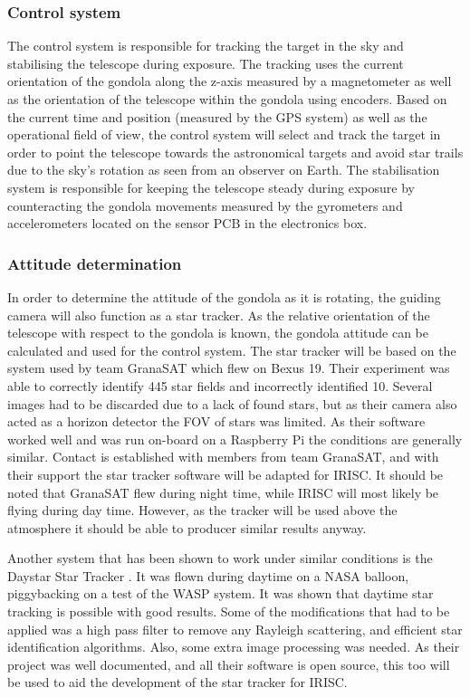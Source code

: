 
\subsubsection{Control system}
The control system is responsible for tracking the target in the sky and stabilising the telescope during exposure. The tracking uses the current orientation of the gondola along the z-axis measured by a magnetometer as well as the orientation of the telescope within the gondola using encoders. Based on the current time and position (measured by the GPS system) as well as the operational field of view, the control system will select and track the target in order to point the telescope towards the astronomical targets and avoid star trails due to the sky's rotation as seen from an observer on Earth. The stabilisation system is responsible for keeping the telescope steady during exposure by counteracting the gondola movements measured by the gyrometers and accelerometers located on the sensor PCB in the electronics box.


\subsubsection{Attitude determination}
In order to determine the attitude of the gondola as it is rotating, the guiding camera will also function as a star tracker. As the relative orientation of the telescope with respect to the gondola is known, the gondola attitude can be calculated and used for the control system. The star tracker will be based on the system used by team GranaSAT which flew on Bexus 19. Their experiment was able to correctly identify 445 star fields and incorrectly identified 10. Several images had to be discarded due to a lack of found stars, but as their camera also acted as a horizon detector the FOV of stars was limited. As their software worked well and was run on-board on a Raspberry Pi the conditions are generally similar. Contact is established with members from team GranaSAT, and with their support the star tracker software will be adapted for IRISC. It should be noted that GranaSAT flew during night time, while IRISC will most likely be flying during day time. However, as the tracker will be used above the atmosphere it should be able to producer similar results anyway.

Another system that has been shown to work under similar conditions is the Daystar Star Tracker \cite{daystar}. It was flown during daytime on a NASA balloon, piggybacking on a test of the WASP system. It was shown that daytime star tracking is possible with good results. Some of the modifications that had to be applied was a high pass filter to remove any Rayleigh scattering, and efficient star identification algorithms. Also, some extra image processing was needed. As their project was well documented, and all their software is open source, this too will be used to aid the development of the star tracker for IRISC.

